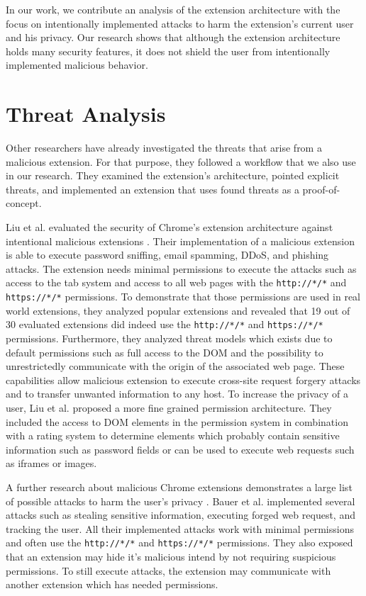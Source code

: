  	In our work, we contribute an analysis of the extension architecture with the focus on intentionally implemented attacks to harm the extension's current user and his privacy. Our research shows that although the extension architecture holds many security features, it does not shield the user from intentionally implemented malicious behavior.
 
 \section{Threat Analysis}
 
	Other researchers have already investigated the threats that arise from a malicious extension. For that purpose, they followed a workflow that we also use in our research. They examined the extension's architecture, pointed explicit threats, and implemented an extension that uses found threats as a proof-of-concept.
 
	Liu et al. evaluated the security of Chrome's extension architecture against intentional malicious extensions \cite{Liu12chromeextensions:}. Their implementation of a malicious extension is able to execute password sniffing, email spamming, DDoS, and phishing attacks. The extension needs minimal permissions to execute the attacks such as access to the tab system and access to all web pages with the \texttt{http://*/*} and \texttt{https://*/*} permissions. To demonstrate that those permissions are used in real world extensions, they analyzed popular extensions and revealed that 19 out of 30 evaluated extensions did indeed use the \texttt{http://*/*} and \texttt{https://*/*} permissions. Furthermore, they analyzed threat models which exists due to default permissions such as full access to the DOM and the possibility to unrestrictedly communicate with the origin of the associated web page. These capabilities allow malicious extension to execute cross-site request forgery attacks and to transfer unwanted information to any host. To increase the privacy of a user, Liu et al. proposed a more fine grained permission architecture. They included the access to DOM elements in the permission system in combination with a rating system to determine elements which probably contain sensitive information such as password fields or can be used to execute web requests such as iframes or images. 
	 	
	A further research about malicious Chrome extensions demonstrates a large list of possible attacks to harm the user's privacy \cite{extensions:cns14}. Bauer et al. implemented several attacks such as stealing sensitive information, executing forged web request, and tracking the user. All their implemented attacks work with minimal permissions and often use the \texttt{http://*/*} and \texttt{https://*/*} permissions. They also exposed that an extension may hide it's malicious intend by not requiring suspicious permissions. To still execute attacks, the extension may communicate with another extension which has needed permissions.
	 
